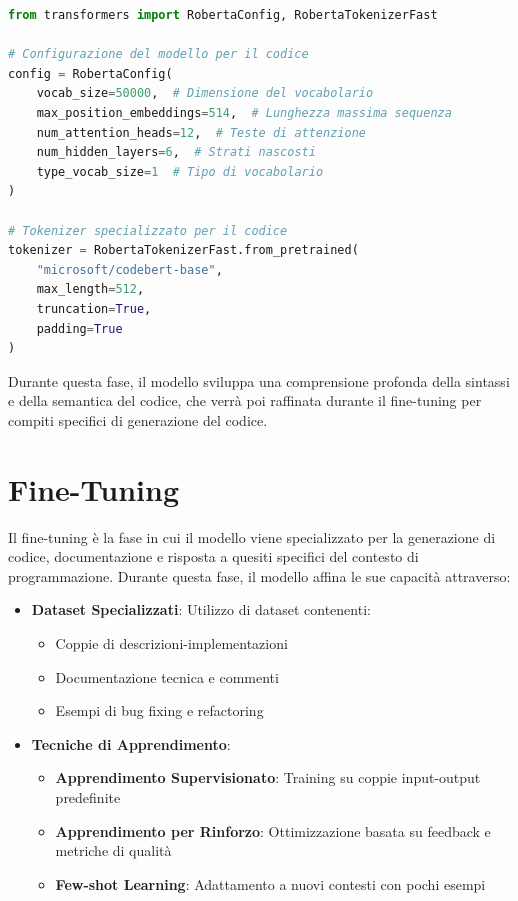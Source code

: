\documentclass[12pt,a4paper,openright,twoside]{book}
\begin{document}
\begin{lstlisting}[language=Python]
from transformers import RobertaConfig, RobertaTokenizerFast

# Configurazione del modello per il codice
config = RobertaConfig(
    vocab_size=50000,  # Dimensione del vocabolario
    max_position_embeddings=514,  # Lunghezza massima sequenza
    num_attention_heads=12,  # Teste di attenzione
    num_hidden_layers=6,  # Strati nascosti
    type_vocab_size=1  # Tipo di vocabolario
)

# Tokenizer specializzato per il codice
tokenizer = RobertaTokenizerFast.from_pretrained(
    "microsoft/codebert-base",
    max_length=512,
    truncation=True,
    padding=True
)
\end{lstlisting}

Durante questa fase, il modello sviluppa una comprensione profonda della sintassi e della semantica del codice, che verrà poi raffinata durante il fine-tuning per compiti specifici di generazione del codice.
\section{Fine-Tuning}
Il fine-tuning è la fase in cui il modello viene specializzato per la generazione di codice, documentazione e risposta a quesiti specifici del contesto di programmazione. Durante questa fase, il modello affina le sue capacità attraverso:

\begin{itemize}
    \item \textbf{Dataset Specializzati}: Utilizzo di dataset contenenti:
    \begin{itemize}
        \item Coppie di descrizioni-implementazioni
        \item Documentazione tecnica e commenti
        \item Esempi di bug fixing e refactoring
    \end{itemize}
    
    \item \textbf{Tecniche di Apprendimento}:
    \begin{itemize}
        \item \textbf{Apprendimento Supervisionato}: Training su coppie input-output predefinite
        \item \textbf{Apprendimento per Rinforzo}: Ottimizzazione basata su feedback e metriche di qualità
        \item \textbf{Few-shot Learning}: Adattamento a nuovi contesti con pochi esempi
    \end{itemize}
\end{itemize}
\end{document}
